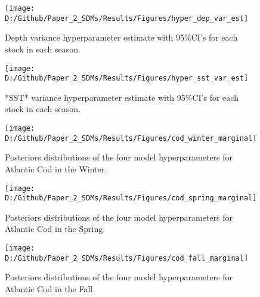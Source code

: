 \documentclass[
]{article}
\begin{document}
\begin{figure}[htb]

{\centering \texttt{[image: D:/Github/Paper\_2\_SDMs/Results/Figures/hyper\_dep\_var\_est]} 

}

\caption{Depth variance hyperparameter estimate with 95\%CI's for each stock in each season.}\label{fig:hyper-dep-var-est}
\end{figure}

\clearpage

\begin{figure}[htb]

{\centering \texttt{[image: D:/Github/Paper\_2\_SDMs/Results/Figures/hyper\_sst\_var\_est]} 

}

\caption{*SST* variance hyperparameter estimate with 95\%CI's for each stock in each season.}\label{fig:hyper-sst-var-est}
\end{figure}

\clearpage

\begin{figure}[htb]

{\centering \texttt{[image: D:/Github/Paper\_2\_SDMs/Results/Figures/cod\_winter\_marginal]} 

}

\caption{Posteriors distributions of the four model hyperparameters for Atlantic Cod in the Winter.}\label{fig:hyper-cod-winter-post}
\end{figure}

\clearpage

\begin{figure}[htb]

{\centering \texttt{[image: D:/Github/Paper\_2\_SDMs/Results/Figures/cod\_spring\_marginal]} 

}

\caption{Posteriors distributions of the four model hyperparameters for Atlantic Cod in the Spring.}\label{fig:hyper-cod-spring-post}
\end{figure}

\clearpage

\begin{figure}[htb]

{\centering \texttt{[image: D:/Github/Paper\_2\_SDMs/Results/Figures/cod\_fall\_marginal]} 

}

\caption{Posteriors distributions of the four model hyperparameters for Atlantic Cod  in the Fall.}\label{fig:hyper-cod-fall-post}
\end{figure}
\end{document}

